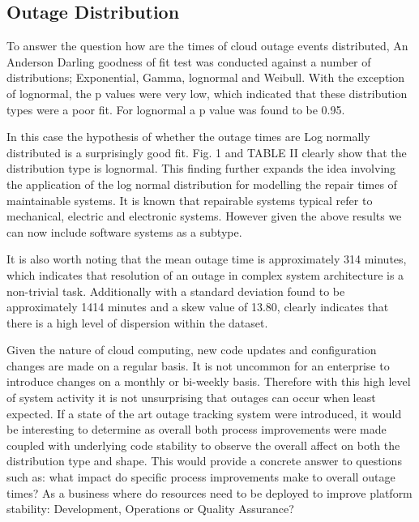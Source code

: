 \documentclass[conference]{IEEEtran}
\begin{document}
\subsection{Outage Distribution}

To answer the question how are the times of cloud outage events distributed,  An Anderson Darling goodness of fit test was conducted against a number of distributions; Exponential, Gamma, lognormal and Weibull. With the exception of lognormal,  the p values were very low, which indicated that these distribution types were a poor fit. For lognormal a p value was found to be 0.95. \par

In this case the hypothesis of whether the outage times are Log normally distributed is a surprisingly good fit. Fig. 1 and TABLE II clearly show that the distribution type is lognormal. This finding further expands the idea involving the application of the log normal distribution for modelling the repair times of maintainable systems. It is known that repairable systems typical refer to mechanical, electric and electronic systems. However given the above results we can now include software systems as a subtype.\par

It is also worth noting that the mean outage time is approximately 314 minutes, which indicates that resolution of an outage in complex system architecture is a non-trivial task. Additionally with a standard deviation found to be approximately 1414 minutes and a skew value of 13.80, clearly indicates that there is a high level of dispersion within the dataset. \par

Given the nature of cloud computing, new code updates and configuration changes are made on a regular basis. It is not uncommon for an enterprise to introduce changes on a monthly or bi-weekly basis. Therefore with this high level of system activity it is not unsurprising that outages can occur when least expected. If a state of the art outage tracking system were introduced, it would be interesting to determine as overall both process improvements were made coupled with underlying code stability to observe the overall affect on both the distribution type and shape. This would provide a concrete answer to questions such as: what impact do specific process improvements make to overall outage times? As a business where do resources need to be deployed to improve platform stability: Development, Operations or Quality Assurance? \par
\end{document}
